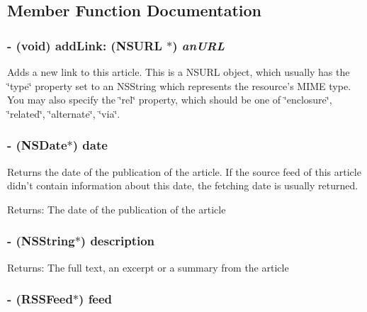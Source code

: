 \subsection{Member Function Documentation}
\subsubsection{\setlength{\rightskip}{0pt plus 5cm}- (void) add\-Link: (NSURL $\ast$) {\em an\-URL}}\label{interfaceRSSArticle_a9}


Adds a new link to this article. This is a NSURL object, which usually has the \char`\"{}type\char`\"{} property set to an NSString which represents the resource's MIME type. You may also specify the \char`\"{}rel\char`\"{} property, which should be one of \char`\"{}enclosure\char`\"{}, \char`\"{}related\char`\"{}, \char`\"{}alternate\char`\"{}, \char`\"{}via\char`\"{}.
\subsubsection{\setlength{\rightskip}{0pt plus 5cm}- (NSDate$\ast$) date }\label{interfaceRSSArticle_a12}


Returns the date of the publication of the article. If the source feed of this article didn't contain information about this date, the fetching date is usually returned.

\begin{Desc}
\item[Returns:]The date of the publication of the article\end{Desc}
\subsubsection{\setlength{\rightskip}{0pt plus 5cm}- (NSString$\ast$) description }\label{interfaceRSSArticle_a8}


\begin{Desc}
\item[Returns:]The full text, an excerpt or a summary from the article \end{Desc}
\subsubsection{\setlength{\rightskip}{0pt plus 5cm}- ({\bf RSSFeed}$\ast$) feed }\label{interfaceRSSArticle_a14}


